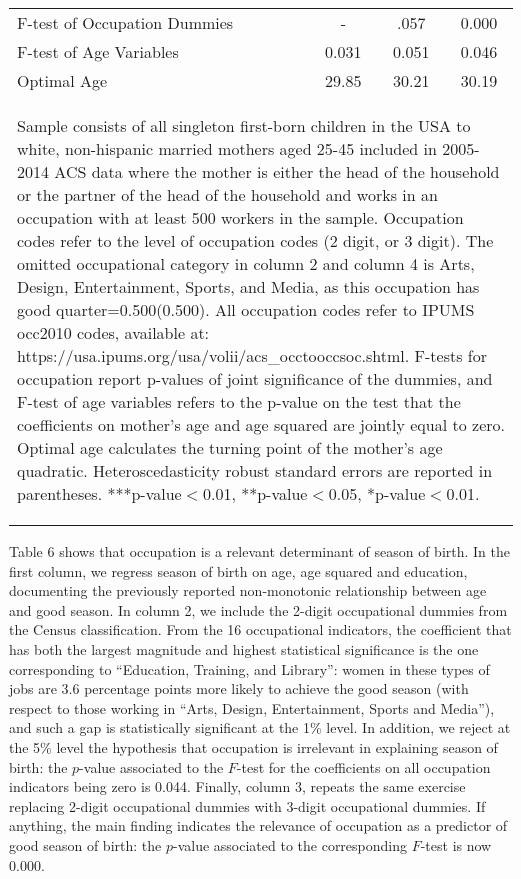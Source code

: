 \documentclass[a4paper, 11.5 pt]{article}
\theoremstyle{plain}
\begin{document}
\begin{doublespace}
\begin{table}[htbp]
{\begin{tabular}{l*{3}{c}}
F-test of Occupation Dummies&-&.057&0.000\\
F-test of Age Variables&0.031&0.051&0.046\\
Optimal Age&29.85&30.21&30.19\\ \bottomrule
\multicolumn{4}{p{14.4cm}}{\begin{footnotesize}Sample consists of all
 singleton first-born children in the USA to white, non-hispanic
married mothers aged 25-45 included in 2005-2014 ACS data where the
mother is either the head of the household or the partner of the head
 of the household and works in an occupation with at least 500
workers in the sample. Occupation codes refer to the level of
occupation codes (2 digit, or 3 digit). The omitted occupational
category in column 2 and column 4 is Arts, Design, Entertainment,
Sports, and Media, as this occupation has good quarter=0.500(0.500).
 All occupation codes refer to IPUMS occ2010 codes, available at:
https://usa.ipums.org/usa/volii/acs\_occtooccsoc.shtml. F-tests for
occupation report p-values of joint significance of the dummies, and
F-test of age variables refers to the p-value on the test that               the coefficients on mother's age and age squared are jointly equal               to zero.  Optimal age calculates the turning point of the mother's age               quadratic.  Heteroscedasticity robust standard errors are reported in              parentheses. ***p-value$<$0.01, **p-value$<$0.05, *p-value$<$0.01.
\end{footnotesize}}\end{tabular}}\end{table}


\newpage
Table 6 shows that occupation is a relevant determinant of season of birth. In the first column, we regress season of birth on age, age squared and education, documenting the previously reported non-monotonic relationship between age and good season. In column 2, we include the 2-digit occupational dummies from the Census classification. From the 16 occupational indicators, the coefficient that has both the largest magnitude and highest statistical significance is the one corresponding to ``Education, Training, and Library'': women in these types of jobs are 3.6 percentage points more likely to achieve the good season (with respect to those working in ``Arts, Design, Entertainment, Sports and Media''), and such a gap is statistically significant at the 1\% level. In addition, we reject at the 5\% level the hypothesis that occupation is irrelevant in explaining season of birth: the $p$-value associated to the $F$-test for the coefficients on all occupation indicators being zero is 0.044. Finally, column 3, repeats the same exercise replacing 2-digit occupational dummies with 3-digit occupational dummies. If anything, the main finding indicates the relevance of occupation as a predictor of good season of birth: the $p$-value associated to the corresponding $F$-test is now 0.000.



\end{doublespace}
\end{document}
